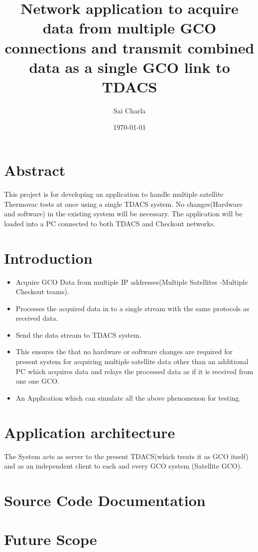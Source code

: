 \documentclass[12pt, a4paper]{report}
\title{Network application to acquire data from multiple GCO connections and
	   transmit combined data as a single GCO link to TDACS}
\author{Sai Charla}
\date{\today}
\begin{document}
\maketitle
\tableofcontents

\chapter*{Abstract}
\par This project is for developing an application to handle multiple satellite
Thermovac tests at once using a single TDACS system. No changes(Hardware and
software) in the existing system will be necessary. The application will be
loaded into a PC connected to both TDACS and Checkout networks.

\chapter{Introduction}
	\begin{itemize}
			\item Acquire GCO Data from multiple IP addresses(Multiple Satellites
					-Multiple Checkout teams).
			\item Processes the acquired data in to a single stream with the same
					protocols as received data.
			\item Send the data stream to TDACS system.
			\item This ensures the that no hardware or software changes are required
					for present system for acquiring multiple satellite data other than an
					additional PC which acquires data and relays the processed data as if it
					is received from one one GCO.
			\item An Application which can simulate all the above phenomenon for
					testing.
	\end{itemize}

\chapter{Application architecture}
The System acts as server to the present TDACS(which treats it as GCO itself)
and as an independent client to each and every GCO system (Satellite GCO).

\chapter{Source Code Documentation}
\chapter{Future Scope}
\end{document}
